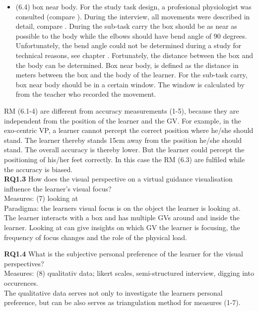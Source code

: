 \begin{itemize}
\item[] (6.4) box near body. For the study task design, a profesional physiologist was consulted (compare ). During the interview, all movements were described in detail, compare . During the sub-task carry the box should be as near as possible to the body while the elbows should have bend angle of 90 degrees. Unfortunately, the bend angle could not be determined during a study for technical reasons, see chapter . Fortunately, the distance between the box and the body can be determined. Box near body, is defined as the distance in meters between the box and the body of the learner. For the sub-task carry, box near body should be in a certain window. The window is calculated by from the teacher who recorded the movement.
\end{itemize}

RM (6.1-4) are different from accuracy measurements (1-5), because they are independent from the position of the learner and the GV. For example, in the exo-centric VP, a learner cannot percept the correct position where he/she should stand. The learner thereby stands 15cm away from the position he/she should stand. The overall accuracy is thereby lower. But the learner could percept the positioning of his/her feet correctly. In this case the RM (6.3) are fulfiled while the accuracy is biased.\\

\textbf{RQ1.3} How does the visual perspective on a virtual guidance visualisation influence the learner's visual focus?\\
Measures: (7) looking at\\
Paradigma: the learners visual focus is on the object the learner is looking at.\\
The learner interacts with a box and has multiple GVs around and inside the learner. Looking at can give insights on which GV the learner is focusing, the frequency of focus changes and the role of the physical load.

\textbf{RQ1.4} What is the subjective personal preference of the learner for the visual perspectives?\\
Measures: (8) qualitativ data; likert scales, semi-structured interview, digging into occurences.\\
The qualitative data serves not only to investigate the learners personal preference, but can be also serves as triangulation method for measures (1-7).\\

